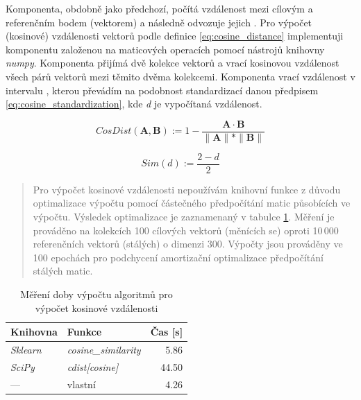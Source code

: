 \documentclass[thesis=M,czech]{FITthesis}[2019/12/23]
\begin{document}
Komponenta, obdobně jako předchozí, počítá vzdálenost mezi cílovým a referenčním bodem (vektorem) a následně odvozuje jejich . Pro výpočet (kosinové) vzdálenosti vektorů podle definice \ref{eq:cosine_distance} implementuji komponentu založenou na maticových operacích pomocí nástrojů knihovny \textit{numpy}. Komponenta  přijímá dvě kolekce vektorů a vrací kosinovou vzdálenost všech párů vektorů mezi těmito dvěma kolekcemi. Komponenta vrací vzdálenost v intervalu \interval[{0,2}], kterou převádím na podobnost standardizací danou předpisem \ref{eq:cosine_standardization}, kde \textit{d} je vypočítaná vzdálenost.

\begin{equation} \label{eq:cosine_distance}
CosDist(\mathbf{A}, \mathbf{B}) := 1 - \frac{\mathbf{A} \cdot \mathbf{B}}{\| \mathbf{A}\|*\| \mathbf{B}\|}
\end{equation}

\begin{equation} \label{eq:cosine_standardization}
Sim(d) := \frac{2-d}{2}
\end{equation}

\begin{quote}
    Pro výpočet kosinové vzdálenosti nepoužívám knihovní funkce z důvodu optimalizace výpočtu pomocí částečného předpočítání matic působících ve výpočtu. Výsledek optimalizace je zaznamenaný v tabulce \ref{table:experiment_similarity}. Měření je prováděno na kolekcích 100 cílových vektorů (měnících se) oproti 10\,000 referenčních vektorů (stálých) o dimenzi 300. Výpočty jsou prováděny ve 100 epochách pro podchycení amortizační optimalizace předpočítání stálých matic.
\end{quote}
\begin{table}[h!]
\centering
\begin{tabular}{ |l|l|r| }
\hline
Knihovna & Funkce & Čas [s] \\\hline
\hline
\textit{Sklearn}\footnotemark & \textit{cosine\_similarity} & 5.86 \\
\textit{SciPy}\footnotemark & \textit{cdist[cosine]} & 44.50 \\
--- & vlastní & 4.26 \\\hline
\end{tabular}
\caption{Měření doby výpočtu algoritmů pro výpočet kosinové vzdálenosti}
\label{table:experiment_similarity}
\end{table}
\newpage
\end{document}
